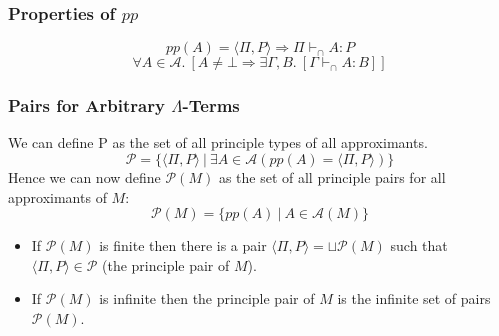 \subsubsection{Properties of $pp$}
\[pp(A) = \langle \Pi, P \rangle \Rightarrow \Pi \vdash_\cap A : P\]
\[\forall A \in \mathcal{A} . \ [A \neq \bot \Rightarrow \exists \Gamma, B . \ [\Gamma \vdash_\cap A : B]]\]

\subsubsection{Pairs for Arbitrary $\Lambda$-Terms}
We can define P as the set of all principle types of all approximants.
\[\mathcal{P} = \{ \langle \Pi, P \rangle \ | \ \exists A \in \mathcal{A} (pp(A) = \langle \Pi, P \rangle)\}\]
Hence we can now define $\mathcal{P}(M)$ as the set of all principle pairs for all approximants of $M$:
\[\mathcal{P}(M) = \{pp(A) \ | \ A \in \mathcal{A}(M)\}\]
\begin{itemize}
	\item If $\mathcal{P}(M)$ is finite then there is a pair $\langle \Pi, P \rangle = \sqcup \mathcal{P}(M)$ such that $\langle \Pi, P \rangle \in \mathcal{P}$ (the principle pair of $M$).
	\item If $\mathcal{P}(M)$ is infinite then the principle pair of $M$ is the infinite set of pairs $\mathcal{P}(M)$.
\end{itemize}



